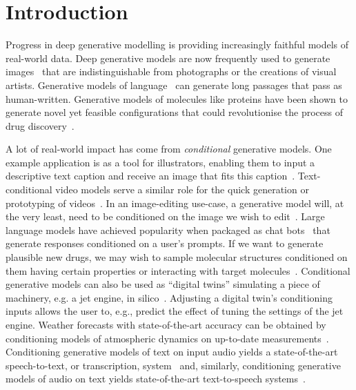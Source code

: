 \chapter{Introduction}
\label{ch:introduction}

Progress in deep generative modelling is providing increasingly faithful models of real-world data. Deep generative models are now frequently used to generate images~\citep{rombach2022high,ho2022imagen} that are indistinguishable from photographs or the creations of visual artists. Generative models of language~\citep{wolf2020transformers} can generate long passages that pass as human-written. Generative models of molecules like proteins have been shown to generate novel yet feasible configurations that could revolutionise the process of drug discovery~\citep{hoogeboom2022equivariant,watson2022broadly}. 

A lot of real-world impact has come from \textit{conditional} generative models. 
One example application is as a tool for illustrators, enabling them to input a descriptive text caption and receive an image that fits this caption~\citep{rombach2022high,ho2022imagen}. Text-conditional video models serve a similar role for the quick generation or prototyping of videos~\citep{ho2022video}. In an image-editing use-case, a generative model will, at the very least, need to be conditioned on the image we wish to edit~\citep{rombach2022high,sheynin2023emu}. Large language models have achieved popularity when packaged as chat bots~\citep{wolf2020transformers} that generate responses conditioned on a user's prompts. If we want to generate plausible new drugs, we may wish to sample molecular structures conditioned on them having certain properties or interacting with target molecules~\citep{watson2022broadly}. Conditional generative models can also be used as ``digital twins'' simulating a piece of machinery, e.g. a jet engine, in silico~\citep{munk2022probabilistic,fuller2020digital}. Adjusting a digital twin's conditioning inputs allows the user to, e.g., predict the effect of tuning the settings of the jet engine. Weather forecasts with state-of-the-art accuracy can be obtained by conditioning models of atmospheric dynamics on up-to-date measurements~\citep{lam2022graphcast}. Conditioning generative models of text on input audio yields a state-of-the-art speech-to-text, or transcription, system~\citep{radford2023robust} and, similarly, conditioning generative models of audio on text yields state-of-the-art text-to-speech systems~\citep{tan2024naturalspeech}.


